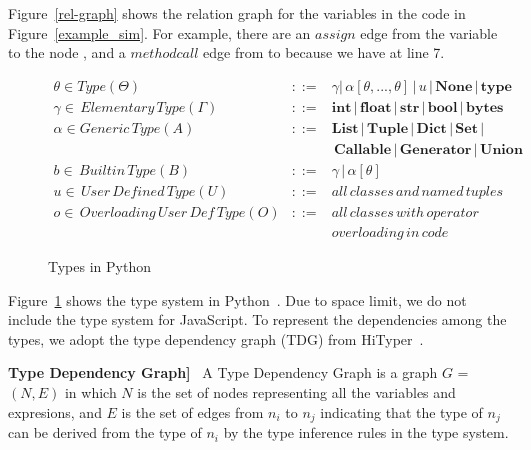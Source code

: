 Figure~\ref{rel-graph} shows the relation graph for the variables in
the code in Figure~\ref{example_sim}. For example, there are an
$assign$ edge from the variable  to the node
, and a $methodcall$ edge from  to
 because we have  at line
7.




\begin{figure}[t]
  \small
  \begin{eqnarray*}
    \theta \in Type (\Theta) &::=& \gamma | \, \alpha [\theta, ..., \theta] \, | \, u \, | \, \mathbf{None} \, | \, \mathbf{type}\\
  \gamma \in \, Elementary \, Type (\Gamma) &::=& \mathbf{int} \, | \, \mathbf{float} \, | \, \mathbf{str} \, | \, \mathbf{bool} \, | \, \mathbf{bytes}\\
  \alpha \in Generic \, Type (A) &::=& \mathbf{List} \, | \, \mathbf{Tuple} \, | \, \mathbf{Dict} \, | \, \mathbf{Set} \, |\\
  & & \, \mathbf{Callable} \, | \, \mathbf{Generator} \, | \, \mathbf{Union}\\
  b \in \, Builtin \, Type (B) &::=& \gamma \, | \, \alpha[\theta]\\
  u \in \, User \, Defined \, Type (U) &::=& all \, classes \, and \, named \, tuples\\
  o \in \, Overloading \, User \, Def \, Type (O) &::=& all \, classes \, with \, operator \\
  & & overloading \, in \, code
  \end{eqnarray*}
  \vspace{-18pt}
\caption{Types in Python}
\label{python-types}
\end{figure}

Figure~\ref{python-types} shows the type system in
Python~\cite{type-graph-icse22}. Due to space limit, we do not include
the type system for JavaScript. To represent the dependencies among
the types, we adopt the type dependency graph (TDG) from
HiTyper~\cite{type-graph-icse22}.

\begin{definition}{\bf Type Dependency Graph]}~\cite{type-graph-icse22}
    \label{tdg-def}
A Type Dependency Graph is a graph $G$ = $(N,E)$ in which $N$ is the
set of nodes representing all the variables and expresions, and $E$ is
the set of edges from $n_i$ to $n_j$ indicating that the type of $n_j$
can be derived from the type of $n_i$ by the type inference rules in
the type system.
\end{definition}

